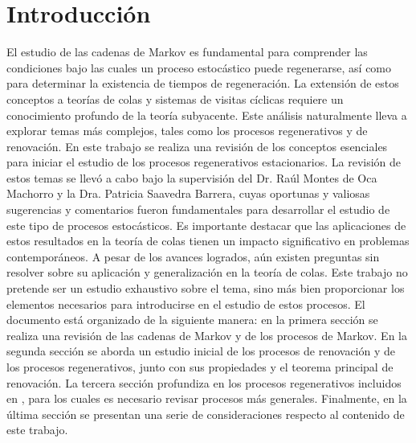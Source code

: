 \documentclass{article}
\numberwithin{equation}{section}
\begin{document}
\tableofcontents

\section*{Introducción}
El estudio de las cadenas de Markov es fundamental para comprender las condiciones bajo las cuales un proceso estocástico puede regenerarse, así como para determinar la existencia de tiempos de regeneración. La extensión de estos conceptos a teorías de colas y sistemas de visitas cíclicas requiere un conocimiento profundo de la teoría subyacente. Este análisis naturalmente lleva a explorar temas más complejos, tales como los procesos regenerativos y de renovación. En este trabajo se realiza una revisión de los conceptos esenciales para iniciar el estudio de los procesos regenerativos estacionarios. La revisión de estos temas se llevó a cabo bajo la supervisión del Dr. Raúl Montes de Oca Machorro y la Dra. Patricia Saavedra Barrera, cuyas oportunas y valiosas sugerencias y comentarios fueron fundamentales para desarrollar el estudio de este tipo de procesos estocásticos. Es importante destacar que las aplicaciones de estos resultados en la teoría de colas tienen un impacto significativo en problemas contemporáneos. A pesar de los avances logrados, aún existen preguntas sin resolver sobre su aplicación y generalización en la teoría de colas. Este trabajo no pretende ser un estudio exhaustivo sobre el tema, sino más bien proporcionar los elementos necesarios para introducirse en el estudio de estos procesos. El documento está organizado de la siguiente manera: en la primera sección se realiza una revisión de las cadenas de Markov y de los procesos de Markov. En la segunda sección se aborda un estudio inicial de los procesos de renovación y de los procesos regenerativos, junto con sus propiedades y el teorema principal de renovación. La tercera sección profundiza en los procesos regenerativos incluidos en \cite{Thorisson}, para los cuales es necesario revisar procesos más generales. Finalmente, en la última sección se presentan una serie de consideraciones respecto al contenido de este trabajo.
\end{document}

